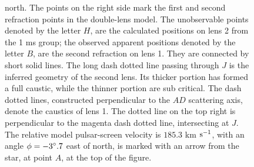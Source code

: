 \documentclass[useAMS,usenatbib]{mn2e}
\begin{document}
\begin{figure}
{north.  The points on the right side mark the first and second
refraction points in the double-lens model.  
The unobservable points
denoted by the letter $H$, are the calculated positions on lens 2 from the
1
 ms group; the observed apparent positions denoted by the letter $B$, are the  
second refraction on lens 1.  They are connected by short solid lines.  The long
dash dotted line passing through $J$ is the inferred geometry of the second
lens.  Its thicker portion has formed a full caustic, while the
thinner portion are sub critical.
The dash 
dotted lines, constructed perpendicular to the $AD$ scattering axis,
denote the caustics of lens 1.  The dotted line on the top right is
perpendicular to the magenta dash dotted line, intersecting at $J$.   
The relative model pulsar-screen velocity is $185.3$ km $\rm s^{-1}$, with an angle $\phi=-3\degree.7$ east of north, is marked with an arrow from the star, at point $A$, at the top of the figure.} 
\label{Doublelens}
\end{figure}







\end{document}
